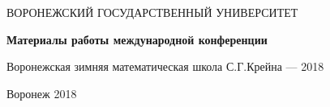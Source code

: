 \begin{titlepage}
   \begin{center}
   ВОРОНЕЖСКИЙ ГОСУДАРСТВЕННЫЙ УНИВЕРСИТЕТ
   \end{center}
\vspace{40mm}

    \begin{center}
      {\LARGE
      \bf

{\bf Материалы работы международной конференции}

 Воронежская зимняя математическая школа С.Г.Крейна --- 2018}

\vspace{10mm}


  \end{center}

 \begin{center}
   \vspace{50mm} Воронеж 2018
 \end{center}
\end{titlepage}
